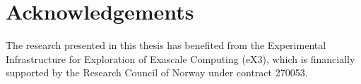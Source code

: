 \chapter*{Acknowledgements}

The research presented in this thesis has benefited from the Experimental Infrastructure for Exploration of Exascale Computing (eX3), which is financially supported by the Research Council of Norway under contract 270053.